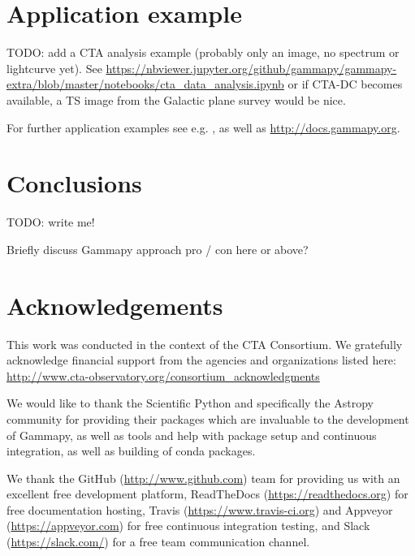 \documentclass{PoS}
\newcommand{\url}[1]{\href{#1}{#1}}
\begin{document}
\section{Application example}
\label{sec:application}

TODO: add a CTA analysis example (probably only an image, no spectrum or
lightcurve yet). See
\url{https://nbviewer.jupyter.org/github/gammapy/gammapy-extra/blob/master/notebooks/cta\_data\_analysis.ipynb}
or if CTA-DC becomes available, a TS image from the Galactic plane survey would
be nice.

For further application examples see e.g. \cite{julien, roberta, cyril},
as well as \url{http://docs.gammapy.org}.

\section{Conclusions}
\label{sec:conclusions}

TODO: write me!

Briefly discuss Gammapy approach pro / con here or above?

\section{Acknowledgements}
\label{sed:acknowledgements}

This work was conducted in the context of the CTA Consortium. We gratefully
acknowledge financial support from the agencies and organizations listed here:
\url{http://www.cta-observatory.org/consortium\_acknowledgments}

We would like to thank the Scientific Python and specifically the Astropy
community for providing their packages which are invaluable to the development
of Gammapy, as well as tools and help with package setup and continuous
integration, as well as building of conda packages.

We thank the GitHub (\url{http://www.github.com}) team for providing us with an
excellent free development platform, ReadTheDocs (\url{https://readthedocs.org})
for free documentation hosting, Travis (\url{https://www.travis-ci.org}) and
Appveyor (\url{https://appveyor.com}) for free continuous integration testing,
and Slack (\url{https://slack.com/}) for a free team communication channel.




\end{document}
